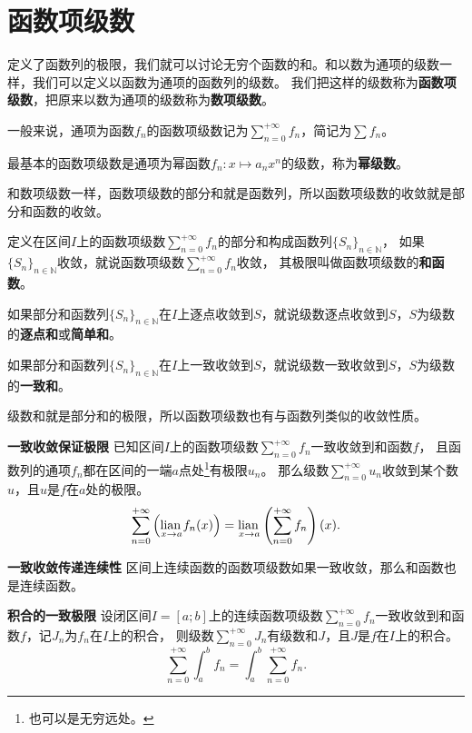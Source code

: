 \documentclass[12pt,UTF8]{ctexbook}
\begin{document}
\section{函数项级数}

定义了函数列的极限，我们就可以讨论无穷个函数的和。和以数为通项的级数一样，我们可以定义以函数为通项的函数列的级数。
我们把这样的级数称为\textbf{函数项级数}，把原来以数为通项的级数称为\textbf{数项级数}。

一般来说，通项为函数$f_n$的函数项级数记为$\sum_{n=0}^{+\infty} f_n$，简记为$\sum f_n$。

最基本的函数项级数是通项为幂函数$f_n: x\mapsto a_n x^n$的级数，称为\textbf{幂级数}。

和数项级数一样，函数项级数的部分和就是函数列，所以函数项级数的收敛就是部分和函数的收敛。

定义在区间$I$上的函数项级数$\sum_{n=0}^{+\infty} f_n$的部分和构成函数列$\{S_n\}_{n\in\mathbb{N}}$，
如果$\{S_n\}_{n\in\mathbb{N}}$收敛，就说函数项级数$\sum_{n=0}^{+\infty} f_n$收敛，
其极限叫做函数项级数的\textbf{和函数}。

如果部分和函数列$\{S_n\}_{n\in\mathbb{N}}$在$I$上逐点收敛到$S$，就说级数逐点收敛到$S$，$S$为级数的\textbf{逐点和}或\textbf{简单和}。

如果部分和函数列$\{S_n\}_{n\in\mathbb{N}}$在$I$上一致收敛到$S$，就说级数一致收敛到$S$，$S$为级数的\textbf{一致和}。

级数和就是部分和的极限，所以函数项级数也有与函数列类似的收敛性质。

\begin{tm}{\textbf{一致收敛保证极限}}
    已知区间$I$上的函数项级数$\sum_{n=0}^{+\infty} f_n$一致收敛到和函数$f$，
    且函数列的通项$f_n$都在区间的一端$a$点处\footnote{也可以是无穷远处。}有极限$u_n$。
    那么级数$\sum_{n=0}^{+\infty} u_n$收敛到某个数$u$，且$u$是$f$在$a$处的极限。
    $$ \sum_{n=0}^{+\infty} \left(\underset{x\to a}{\operatorname{lian}\,} f_n(x) \right) = \underset{x\to a}{\operatorname{lian}\,} \left(\sum_{n=0}^{+\infty} f_n\right)(x). $$
\end{tm}

\begin{tm}{\textbf{一致收敛传递连续性}}
    区间上连续函数的函数项级数如果一致收敛，那么和函数也是连续函数。
\end{tm}

\begin{tm}{\textbf{积合的一致极限}}
    设闭区间$I=[a;b]$上的连续函数项级数$\sum_{n=0}^{+\infty} f_n$一致收敛到和函数$f$，记$J_n$为$f_n$在$I$上的积合，
    则级数$\sum_{n=0}^{+\infty} J_n$有级数和$J$，且$J$是$f$在$I$上的积合。
    $$ \sum_{n=0}^{+\infty} \int_a^b f_n = \int_a^b \sum_{n=0}^{+\infty} f_n. $$
\end{tm}
\end{document}
